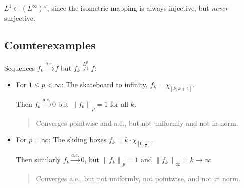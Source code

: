 \begin{proposition}

\(L^1 \subset (L^\infty) {}^{ \vee }\), since the isometric mapping is
always injective, but \emph{never} surjective.

\end{proposition}

\hypertarget{counterexamples}{%
\subsection{Counterexamples}\label{counterexamples}}

\begin{proposition}

Sequences \(f_k \overset{a.e.}\to f\) but
\(f_k \overset{L^p}{\not\to} f\):

\begin{itemize}
\item
  For \(1\leq p < \infty\): The skateboard to infinity,
  \(f_k = \chi_{[k, k+1]}\).

  Then \(f_k \overset{a.e.}\to 0\) but
  \({\left\lVert {f_k} \right\rVert}_p = 1\) for all \(k\).

  \begin{quote}
  Converges pointwise and a.e., but not uniformly and not in norm.
  \end{quote}
\item
  For \(p = \infty\): The sliding boxes
  \(f_k = k \cdot \chi_{[0, \frac 1 k]}\).

  Then similarly \(f_k \overset{a.e.}\to 0\), but
  \({\left\lVert {f_k} \right\rVert}_p = 1\) and
  \({\left\lVert {f_k} \right\rVert}_\infty = k \to \infty\)

  \begin{quote}
  Converges a.e., but not uniformly, not pointwise, and not in norm.
  \end{quote}
\end{itemize}

\end{proposition}

